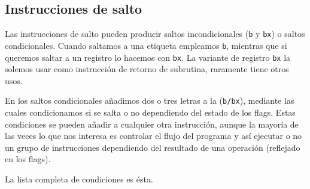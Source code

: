 \subsection{Instrucciones de salto}
\label{sec:InsSal}

Las instrucciones de salto pueden producir saltos incondicionales ({\tt b} y {\tt bx})
o saltos condicionales. Cuando saltamos a una etiqueta empleamos {\tt b}, mientras que
si queremos saltar a un registro lo hacemos con {\tt bx}. La variante de registro {\tt bx}
la solemos usar como instrucción de retorno de subrutina, raramente tiene otros usos.

En los saltos condicionales añadimos dos o tres letras
a la ({\tt b/bx}), mediante las cuales condicionamos si se salta o no dependiendo
del estado de los flags. Estas condiciones se pueden añadir a cualquier
otra instrucción, aunque la mayoría de las veces lo que nos interesa es controlar
el flujo del programa y así ejecutar o no un grupo de instrucciones dependiendo
del resultado de una operación (reflejado en los flags).

La lista completa de condiciones es ésta.

